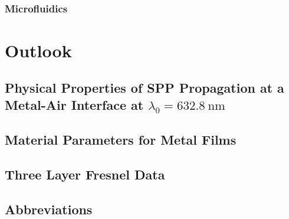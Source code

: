 \documentclass[a4paper]{report}
\begin{document}
\section{}


\section{}

\subsection{Microfluidics}

\chapter{Outlook}
\label{ch:outlook}




\appendix
\section{Physical Properties of SPP Propagation at a Metal-Air Interface at $\lambda_0=\SI{632.8}{\nano\meter}$}


\section{Material Parameters for Metal Films}
\label{sec:drudemetals}


\section{Three Layer Fresnel Data}
\label{sec:threelayerfresnel}


\section{Abbreviations}

\end{document}
